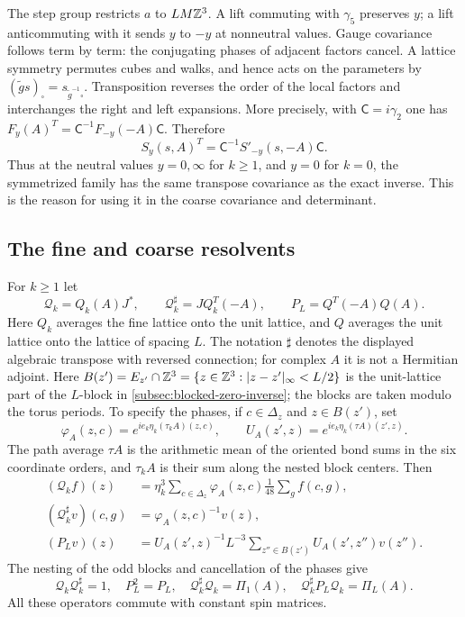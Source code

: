 The step group restricts $a$ to
$LM\mathbb Z^3$. A lift commuting with $\gamma_5$ preserves $y$; a lift
anticommuting with it sends $y$ to $-y$ at nonneutral values.
Gauge covariance follows term by term: the conjugating phases of
adjacent factors cancel. A lattice symmetry permutes cubes and walks,
and hence acts on the parameters by
$(\widetilde g s)_\square=s_{\widetilde g^{-1}\square}$.
Transposition reverses the order of
the local factors and interchanges the right and left expansions.
More precisely, with $\mathsf C=i\gamma_2$ one has
$F_y(A)^T=\mathsf C^{-1}F_{-y}(-A)\mathsf C$. Therefore
\begin{equation}\label{eq:weakened-transpose}
 S_y(s,A)^T=\mathsf C^{-1}S'_{-y}(s,-A)\mathsf C.
\end{equation}
Thus at the neutral values $y=0,\infty$ for $k\ge1$, and $y=0$
for $k=0$, the symmetrized family has the same transpose covariance as
the exact inverse. This is the reason for using it in the coarse
covariance and determinant.

\subsection{The fine and coarse resolvents}\label{subsec:fine-coarse-resolvent}

For $k\ge1$ let
\[
 \mathcal Q_k=Q_k(A)J^*,\qquad
 \mathcal Q_k^\sharp=JQ_k^T(-A),\qquad
 P_L=Q^T(-A)Q(A).
\]
Here $Q_k$ averages the fine lattice onto the unit lattice, and $Q$
averages the unit lattice onto the lattice of spacing $L$.
The notation $\sharp$ denotes the displayed algebraic transpose with
reversed connection; for complex $A$ it is not a Hermitian adjoint.
Here $B(z')=E_{z'}\cap\mathbb Z^3
=\{z\in\mathbb Z^3:|z-z'|_\infty<L/2\}$ is the unit-lattice
part of the $L$-block in \cref{subsec:blocked-zero-inverse};
the blocks are taken modulo the torus periods.
To specify the phases, if $c\in\Delta_z$ and $z\in B(z')$, set
\[
 \varphi_A(z,c)=e^{ie_k\eta_k(\tau_kA)(z,c)},\qquad
 U_A(z',z)=e^{ie_k\eta_k(\tau A)(z',z)}.
\]
The path average $\tau A$ is the arithmetic mean of the oriented bond
sums in the six coordinate orders, and $\tau_kA$ is their sum along
the nested block centers. Then
\begin{align*}
 (\mathcal Q_kf)(z)&=\eta_k^3\sum_{c\in\Delta_z}
                \varphi_A(z,c)\frac1{48}\sum_gf(c,g),\\
 (\mathcal Q_k^\sharp v)(c,g)&=\varphi_A(z,c)^{-1}v(z),\\
 (P_Lv)(z)&=U_A(z',z)^{-1}L^{-3}
                    \sum_{z''\in B(z')}U_A(z',z'')v(z'').
\end{align*}
The nesting of the odd blocks and cancellation of the phases give
\begin{equation}\label{eq:block-algebra}
 \mathcal Q_k\mathcal Q_k^\sharp=1,\quad P_L^2=P_L,\quad
 \mathcal Q_k^\sharp\mathcal Q_k=\Pi_1(A),\quad
 \mathcal Q_k^\sharp P_L\mathcal Q_k=\Pi_L(A).
\end{equation}
All these operators commute with constant spin matrices.

